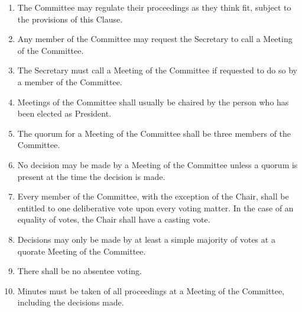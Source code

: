 \documentclass[12pt]{constitution}
\begin{document}
\begin{enumerate}
    \item The Committee may regulate their proceedings as they think fit, subject to the provisions of this Clause.
    \item Any member of the Committee may request the Secretary to call a Meeting of the Committee.
    \item The Secretary must call a Meeting of the Committee if requested to do so by a member of the Committee.
    \item Meetings of the Committee shall usually be chaired by the person who has been elected as President.
    \item The quorum for a Meeting of the Committee shall be three members of the Committee.
    \item No decision may be made by a Meeting of the Committee unless a quorum is present at the time the decision is made.
    \item Every member of the Committee, with the exception of the Chair, shall be entitled to one deliberative vote upon every voting matter. In the case of an equality of votes, the Chair shall have a casting vote.
    \item Decisions may only be made by at least a simple majority of votes at a quorate Meeting of the Committee.
    \item There shall be no absentee voting.
    \item Minutes must be taken of all proceedings at a Meeting of the Committee, including the decisions made.
\end{enumerate}


\label{clause:appointment-committee}
\end{document}
